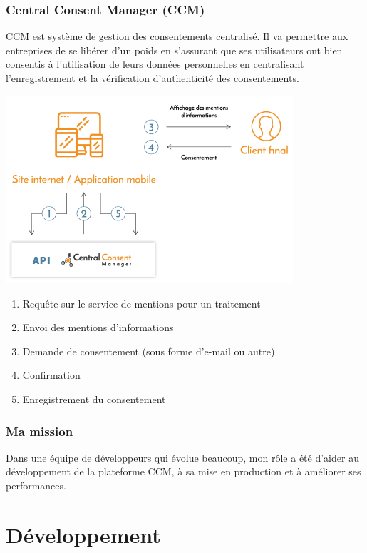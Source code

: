 \documentclass[12pt, a4paper]{report}
\newcommand\tab[1][1cm]{\hspace*{#1}}
\begin{document}
            \subsection{Central Consent Manager (CCM)}
                \tab{} CCM est système de gestion des consentements centralisé. Il va permettre aux entreprises de se libérer d'un poids en s'assurant que ses utilisateurs ont bien consentis à l'utilisation de leurs données personnelles en centralisant l'enregistrement et la vérification d'authenticité des consentements.
                \begin{center}
                    \includegraphics[width=0.8\textwidth]{ccm.png}
                \end{center}
                \begin{enumerate}
                    \item Requête sur le service de mentions pour un traitement
                    \item Envoi des mentions d'informations
                    \item Demande de consentement (sous forme d'e-mail ou autre)
                    \item Confirmation
                    \item Enregistrement du consentement
                \end{enumerate}
            \subsection{Ma mission}
                \tab{} Dans une équipe de développeurs qui évolue beaucoup, mon rôle a été d'aider au développement de la plateforme CCM, à sa mise en production et à améliorer ses performances.
    \chapter{Développement}
\end{document}
